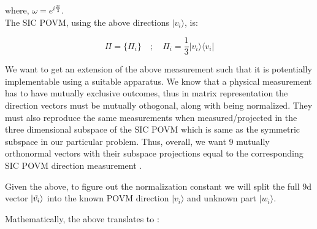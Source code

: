 \documentclass{article}
\begin{document}
where, $\omega = e^{i\frac{2\pi}{3}}$. \\ 

The SIC POVM, using the above directions $| v_i \rangle $, is:

\begin{equation}
    \Pi = \{ \Pi_i \} \quad ; \quad \Pi_i = \frac{1}{3}| v_i \rangle \langle v_i|
\end{equation} 




We want to get an extension of the above measurement such that it is potentially implementable using a suitable apparatus. We know that a physical measurement has to have mutually exclusive outcomes, thus in matrix representation the direction vectors must be mutually othogonal, along with being normalized. They must also reproduce the same measurements when measured/projected in the three dimensional subspace of the SIC POVM which is same as the symmetric subspace in our particular problem.
Thus, overall, we want 9 mutually orthonormal vectors with their subspace projections equal to the corresponding SIC POVM direction measurement .

Given the above, to figure out the normalization constant we will split the full 9d vector $| \Tilde{v_i} \rangle$ into the known POVM direction $|v_i \rangle$ and unknown part $|w_i \rangle$. 

Mathematically, the above translates to :
\end{document}
